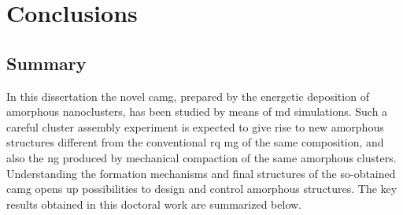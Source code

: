 \chapter{Conclusions} \label{c:conclusions}

\section{Summary}
In this dissertation the novel \cz \gls{camg}, prepared by the energetic deposition of amorphous nanoclusters, has been studied by means of \gls{md} simulations. Such a careful cluster assembly experiment is expected to give rise to new amorphous structures different from the conventional \gls{rq} \gls{mg} of the same composition, and also the \gls{ng} produced by mechanical compaction of the same amorphous clusters. Understanding the formation mechanisms and final structures of the so-obtained \gls{camg} opens up possibilities to design and control amorphous structures. The key results obtained in this doctoral work are summarized below. \par


